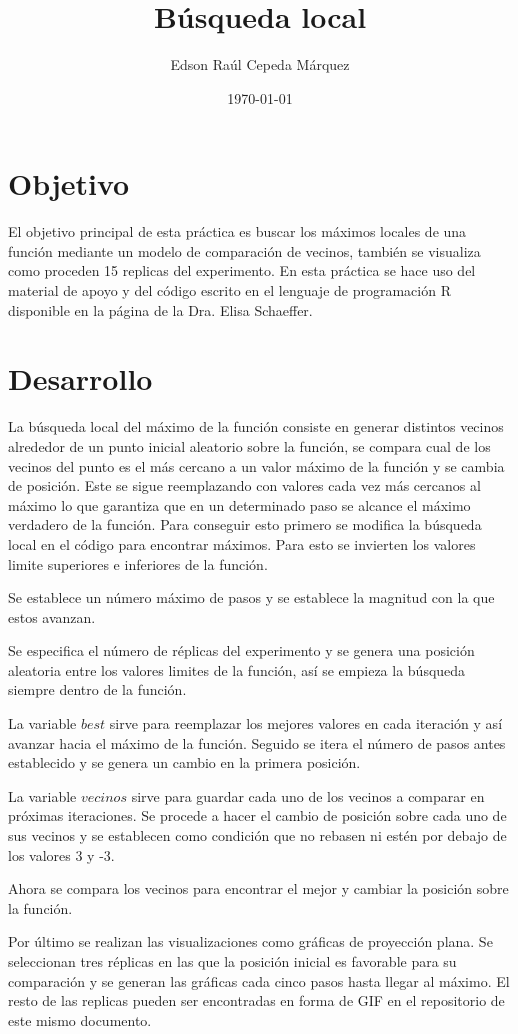 \documentclass{article}
\author{Edson Raúl Cepeda Márquez}
\title{Búsqueda local}
\date{\today}
\begin{document}
\maketitle

\section{Objetivo}
El objetivo principal de esta práctica es buscar los máximos locales de una función mediante un modelo de comparación de vecinos, también se visualiza como proceden 15 replicas del experimento. En esta práctica se hace uso del material de apoyo y del código escrito en el lenguaje de programación R \cite{r} disponible en la página \cite{satu} de la Dra. Elisa Schaeffer.

\section{Desarrollo}
La búsqueda local del máximo de la función consiste en generar distintos vecinos alrededor de un punto inicial aleatorio sobre la función, se compara cual de los vecinos del punto es el más cercano a un valor máximo de la función y se cambia de posición.
Este se sigue reemplazando con valores cada vez más cercanos al máximo lo que garantiza que en un determinado paso se alcance el máximo verdadero de la función. 
Para conseguir esto primero se modifica la búsqueda local en el código para encontrar máximos.
Para esto se invierten los valores limite superiores e inferiores de la función.

Se establece un número máximo de pasos y se establece la magnitud con la que estos avanzan.

Se especifica el número de réplicas del experimento y se genera una posición aleatoria entre los valores limites de la función, así se empieza la búsqueda siempre dentro de la función.

La variable $best$ sirve para reemplazar los mejores valores en cada iteración y así avanzar hacia el máximo de la función.
Seguido se itera el número de pasos antes establecido y se genera un cambio en la primera posición.

La variable $vecinos$ sirve para guardar cada uno de los vecinos a comparar en próximas iteraciones.
Se procede a hacer el cambio de posición sobre cada uno de sus vecinos y se establecen como condición que no rebasen ni estén por debajo de los valores 3 y -3.

Ahora se compara los vecinos para encontrar el mejor y cambiar la posición sobre la función.

Por último se realizan las visualizaciones como gráficas de proyección plana.
Se seleccionan tres réplicas en las que la posición inicial es favorable para su comparación y se generan las gráficas cada cinco pasos hasta llegar al máximo.
El resto de las replicas pueden ser encontradas en forma de GIF en el repositorio \cite{edson} de este mismo documento.
\end{document}
